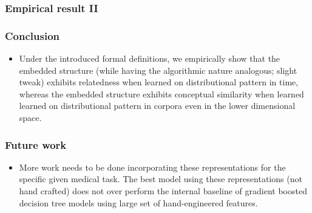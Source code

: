 \documentclass{beamer}
\begin{document}
\begin{frame}
\frametitle{Empirical result II}
\begin{table}[t]
\caption{The mean DCG result for the top 40 neighbors of CUIs associated with
    certain type.}
\label{umls_dcg}
\begin{center}
\begin{small}
\begin{sc}
\end{sc}
\end{small}
\end{center}
\end{table}
\end{frame}


\begin{frame}
\frametitle{Conclusion}
\begin{itemize}
\item 
Under the introduced formal definitions, we empirically show that the embedded structure (while having the algorithmic nature analogous; slight tweak) exhibits relatedness when learned on distributional pattern in time, whereas the embedded structure exhibits conceptual similarity when learned learned on distributional pattern in corpora even in the lower dimensional space.
\end{itemize}
\end{frame}

\begin{frame}
\frametitle{Future work}
\begin{itemize} 

\item More work needs to be done incorporating these representations 
for the specific given medical task. The best model using these representations 
(not hand crafted) does not over perform the internal baseline of gradient boosted
decision tree models using large set of hand-engineered features.
\end{itemize}
\end{frame}
\end{document}
